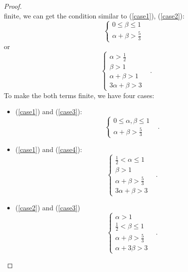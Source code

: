 \documentclass[12pt]{amsart}
\theoremstyle{definition}
\numberwithin{equation}{section}
\begin{document}
\begin{proof}
$$    $$
    finite, we can get the condition similar to (\ref{case1}), (\ref{case2}):
    \begin{equation}
       \begin{cases}
          0\le \beta \le 1 &\\
          \alpha+\beta>\frac{5}{3}
       \end{cases}\label{case3}
    \end{equation}
    or
    \begin{equation}
       \begin{cases}
          \alpha>\frac{1}{2} &\\
          \beta>1 &\\
          \alpha+\beta>1&\\
          3\alpha+\beta>3&
       \end{cases}.\label{case4}
    \end{equation}
    To make the both terms finite, we have four cases:
    \begin{itemize}
       \item (\ref{case1}) and (\ref{case3}):
       \begin{equation}
          \begin{cases}
             0\le \alpha,\beta\le 1 &\\
             \alpha+\beta>\frac{5}{3}&
          \end{cases}.
       \end{equation}
       \item (\ref{case1}) and (\ref{case4}):
       \begin{equation}
          \begin{cases}
             \frac{1}{2}<\alpha\le 1 &\\
             \beta>1 &\\
             \alpha+\beta>\frac{5}{3}&\\
             3\alpha+\beta>3           
          \end{cases}.
       \end{equation}
       \item (\ref{case2}) and (\ref{case3})
       \begin{equation}
          \begin{cases}
             \alpha>1 &\\
             \frac{1}{2}<\beta \le 1 &\\
             \alpha+\beta>\frac{5}{3}&\\
             \alpha+3\beta>3&
          \end{cases}.

\end{equation}
\end{itemize}
\end{proof}
\end{document}
